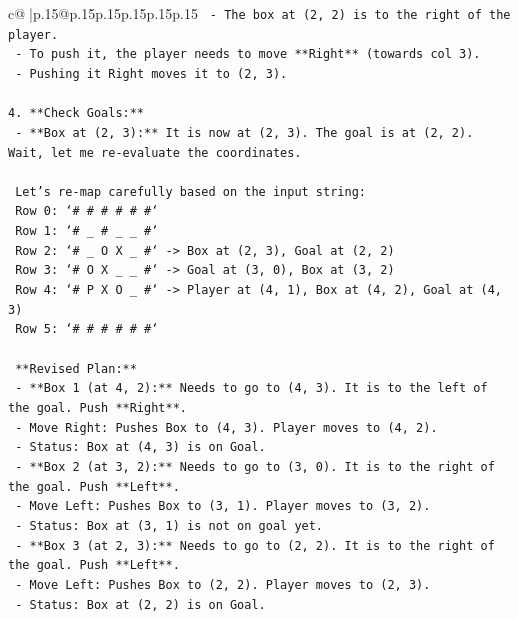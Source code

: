 \documentclass{article}
\begin{document}
{\begin{supertabular}{c@{$\;$}|p{.15\linewidth}@{}p{.15\linewidth}p{.15\linewidth}p{.15\linewidth}p{.15\linewidth}p{.15\linewidth}}
{{{\texttt{    {-} The box at (2, 2) is to the right of the player.} \\
\texttt{    {-} To push it, the player needs to move **Right** (towards col 3).} \\
\texttt{    {-} Pushing it Right moves it to (2, 3).} \\
\\ 
\texttt{4.  **Check Goals:**} \\
\texttt{    {-} **Box at (2, 3):** It is now at (2, 3). The goal is at (2, 2). Wait, let me re{-}evaluate the coordinates.} \\
\\ 
\texttt{    Let's re{-}map carefully based on the input string:} \\
\texttt{    Row 0: `\# \# \# \# \# \#`} \\
\texttt{    Row 1: `\# \_ \# \_ \_ \#`} \\
\texttt{    Row 2: `\# \_ O X \_ \#` {-}> Box at (2, 3), Goal at (2, 2)} \\
\texttt{    Row 3: `\# O X \_ \_ \#` {-}> Goal at (3, 0), Box at (3, 2)} \\
\texttt{    Row 4: `\# P X O \_ \#` {-}> Player at (4, 1), Box at (4, 2), Goal at (4, 3)} \\
\texttt{    Row 5: `\# \# \# \# \# \#`} \\
\\ 
\texttt{    **Revised Plan:**} \\
\texttt{    {-} **Box 1 (at 4, 2):** Needs to go to (4, 3). It is to the left of the goal. Push **Right**.} \\
\texttt{      {-} Move Right: Pushes Box to (4, 3). Player moves to (4, 2).} \\
\texttt{      {-} Status: Box at (4, 3) is on Goal.} \\
\texttt{    {-} **Box 2 (at 3, 2):** Needs to go to (3, 0). It is to the right of the goal. Push **Left**.} \\
\texttt{      {-} Move Left: Pushes Box to (3, 1). Player moves to (3, 2).} \\
\texttt{      {-} Status: Box at (3, 1) is not on goal yet.} \\
\texttt{    {-} **Box 3 (at 2, 3):** Needs to go to (2, 2). It is to the right of the goal. Push **Left**.} \\
\texttt{      {-} Move Left: Pushes Box to (2, 2). Player moves to (2, 3).} \\
\texttt{      {-} Status: Box at (2, 2) is on Goal.} \\
}}}
\end{supertabular}}
\end{document}
